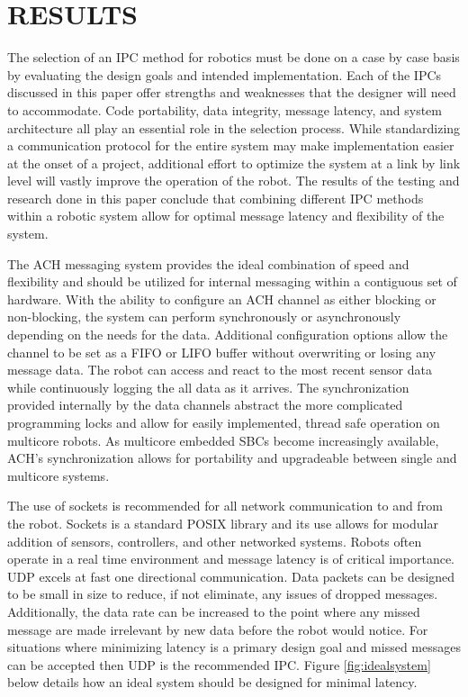 \section{RESULTS}

The selection of an IPC method for robotics must be done on a case by case basis by evaluating the design goals and intended implementation. Each of the IPCs discussed in this paper offer strengths and weaknesses that the designer will need to accommodate. Code portability, data integrity, message latency, and system architecture all play an essential role in the selection process. While standardizing a communication protocol for the entire system may make implementation easier at the onset of a project, additional effort to optimize the system at a link by link level will vastly improve the operation of the robot. The results of the testing and research done in this paper conclude that combining different IPC methods within a robotic system allow for optimal message latency and flexibility of the system.

The ACH messaging system provides the ideal combination of speed and flexibility and should be utilized for internal messaging within a contiguous set of hardware. With the ability to configure an ACH channel as either blocking or non-blocking, the system can perform synchronously or asynchronously depending on the needs for the data. Additional configuration options allow the channel to be set as a FIFO or LIFO buffer without overwriting or losing any message data. The robot can access and react to the most recent sensor data while continuously logging the all data as it arrives. The synchronization provided internally by the data channels abstract the more complicated programming locks and allow for easily implemented, thread safe operation on multicore robots. As multicore embedded SBCs become increasingly available, ACH's synchronization allows for portability and upgradeable between single and multicore systems.

The use of sockets is recommended for all network communication to and from the robot. Sockets is a standard POSIX library and its use allows for modular addition of sensors, controllers, and other networked systems. Robots often operate in a real time environment and message latency is of critical importance. UDP excels at fast one directional communication. Data packets can be designed to be small in size to reduce, if not eliminate, any issues of dropped messages. Additionally, the data rate can be increased to the point where any missed message are made irrelevant by new data before the robot would notice. For situations where minimizing latency is a primary design goal and missed messages can be accepted then UDP is the recommended IPC. Figure \ref{fig:idealsystem} below details how an ideal system should be designed for minimal latency.

